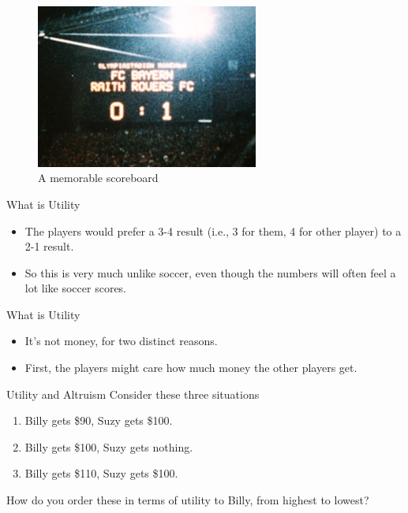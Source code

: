 \documentclass[
  14pt,
  letterpaper,
  ignorenonframetext,
  aspectratio=169,
]{beamer}
\providecommand{\tightlist}{%
  \setlength{\itemsep}{0pt}\setlength{\parskip}{0pt}}\usepackage{longtable,booktabs,array}
\let\olditem\item
\renewcommand{\item}{%
\olditem\vspace{6pt}}
\begin{document}
\begin{frame}
\begin{figure}

{\centering \includegraphics[width=0.65\textwidth,height=0.65\textheight]{images/raith.jpg}

}

\caption{A memorable scoreboard}

\end{figure}
\end{frame}

\begin{frame}{What is Utility}
\protect\hypertarget{what-is-utility-1}{}
\begin{itemize}[<+->]
\tightlist
\item
  The players would prefer a 3-4 result (i.e., 3 for them, 4 for other
  player) to a 2-1 result.
\item
  So this is very much unlike soccer, even though the numbers will often
  feel a lot like soccer scores.
\end{itemize}
\end{frame}

\begin{frame}{What is Utility}
\protect\hypertarget{what-is-utility-2}{}
\begin{itemize}[<+->]
\tightlist
\item
  It's not money, for two distinct reasons.
\item
  First, the players might care how much money the other players get.
\end{itemize}
\end{frame}

\begin{frame}{Utility and Altruism}
\protect\hypertarget{utility-and-altruism}{}
Consider these three situations

\begin{enumerate}
\tightlist
\item
  Billy gets \$90, Suzy gets \$100.
\item
  Billy gets \$100, Suzy gets nothing.
\item
  Billy gets \$110, Suzy gets \$100.
\end{enumerate}

How do you order these in terms of utility to Billy, from highest to
lowest?
\end{frame}
\end{document}
